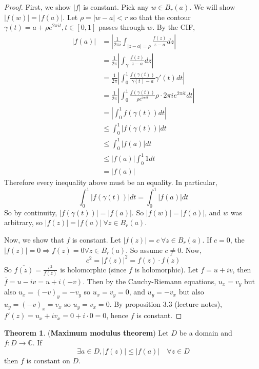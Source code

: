 \documentclass[12pt,a4paper]{article}
\theoremstyle{definition}
\newtheorem{theorem}[definition]{Theorem}
\begin{document}
\begin{proof}
	First, we show $|f|$ is constant. Pick any $w \in B_r(a)$. We will show $|f(w)| = |f(a)|$. Let $\rho = |w - a| < r$ so that the contour $\gamma(t) = a + \rho e^{2 \pi i t}, t \in [0, 1]$ passes through $w$. By the CIF,
	\[
		\begin{aligned}
			|f(a)|
				& = \left| \frac{1}{2 \pi i} \int_{|z - a| = \rho} \frac{f(z)}{z - a} dz \right| \\
				& = \frac{1}{2 \pi} \left| \int_{\gamma} \frac{f(z)}{z - a} dz \right| \\
				& = \frac{1}{2 \pi} \left| \int_{0}^{1} \frac{f(\gamma(t))}{\gamma(t) - a} \gamma'(t) dt \right| \\
				& = \frac{1}{2 \pi} \left| \int_{0}^{1} \frac{f(\gamma(t))}{\rho e^{2 \pi i t}} \rho \cdot 2 \pi i e^{2 \pi i t} dt \right| \\
				& = \left| \int_{0}^{1} f(\gamma(t)) dt \right| \\
				& \le \int_{0}^{1} |f(\gamma(t))| dt \\
				& \le \int_{0}^{1} |f(a)| dt \\
				& \le |f(a)| \int_{0}^{1} 1 dt \\
				& = |f(a)|
		\end{aligned}
	\]
	Therefore every inequality above must be an equality. In particular,
	\[
		\int_{0}^{1} |f(\gamma(t))| dt = \int_{0}^{1} |f(a)| dt
	\]
	So by continuity, $|f(\gamma(t))| = |f(a)|$. So $|f(w)| = |f(a)|$, and $w$ was arbitrary, so $|f(z)| = |f(a)| \ \forall z \in B_r(a)$.

	Now, we show that $f$ is constant. Let $|f(z)| = c \ \forall z \in B_r(a)$. If $c = 0$, the $|f(z)| = 0 \Rightarrow f(z) = 0 \forall z \in B_r(a)$. So assume $c \ne 0$. Now,
	\[
		c^2 = |f(z)|^2 = f(z) \cdot \overline{f(z)}
	\]
	So $\overline{f(z)} = \frac{c^2}{f(z)}$ is holomorphic (since $f$ is holomorphic). Let $f = u + iv$, then $\overline{f} = u - iv = u + i(-v)$. Then by the Cauchy-Riemann equations, $u_x = v_y$ but also $u_x = {(-v)}_y = -v_y$ so $u_x = v_y = 0$, and $u_y = -v_x$ but also $u_y = {(-v)}_x = v_x$ so $u_y = v_x = 0$. By proposition 3.3 (lecture notes), $f'(z) = u_x + i v_x = 0 + i \cdot 0 = 0$, hence $f$ is constant.
\end{proof}

\begin{theorem}
	(\textbf{Maximum modulus theorem}) Let $D$ be a domain and $f: D \rightarrow \mathbb{C}$. If
	\[
		\exists a \in D, |f(z)| \le |f(a)| \quad \forall z \in D
	\]
	then $f$ is constant on $D$.
\end{theorem}
\end{document}
